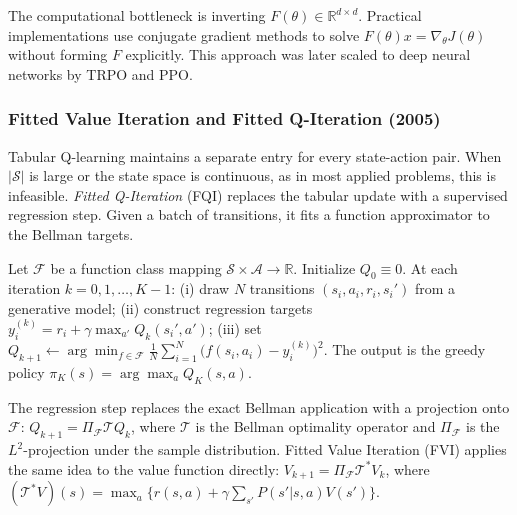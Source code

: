 The computational bottleneck is inverting $F(\theta) \in \mathbb{R}^{d \times d}$. Practical implementations use conjugate gradient methods to solve $F(\theta) x = \nabla_\theta J(\theta)$ without forming $F$ explicitly. This approach was later scaled to deep neural networks by TRPO and PPO.

\subsubsection{Fitted Value Iteration and Fitted Q-Iteration (2005)}
\label{sec:fvi_fqi_algorithms}

Tabular Q-learning maintains a separate entry for every state-action pair. When $|\mathcal{S}|$ is large or the state space is continuous, as in most applied problems, this is infeasible. \emph{Fitted Q-Iteration} (FQI) \citep{Ernst2005} replaces the tabular update with a supervised regression step. Given a batch of transitions, it fits a function approximator to the Bellman targets.

Let $\mathcal{F}$ be a function class mapping $\mathcal{S} \times \mathcal{A} \to \mathbb{R}$.\label{def:fqi} Initialize $Q_0 \equiv 0$. At each iteration $k = 0, 1, \ldots, K-1$: (i) draw $N$ transitions $(s_i, a_i, r_i, s_i')$ from a generative model; (ii) construct regression targets $y_i^{(k)} = r_i + \gamma \max_{a'} Q_k(s_i', a')$; (iii) set $Q_{k+1} \leftarrow \arg\min_{f \in \mathcal{F}} \frac{1}{N} \sum_{i=1}^N \bigl( f(s_i, a_i) - y_i^{(k)} \bigr)^2$. The output is the greedy policy $\pi_K(s) = \arg\max_a Q_K(s,a)$.

The regression step replaces the exact Bellman application with a projection onto $\mathcal{F}$: $Q_{k+1} = \Pi_{\mathcal{F}} \mathcal{T} Q_k$, where $\mathcal{T}$ is the Bellman optimality operator and $\Pi_{\mathcal{F}}$ is the $L^2$-projection under the sample distribution. Fitted Value Iteration (FVI) \citep{MunosSzepesvari2008} applies the same idea to the value function directly: $V_{k+1} = \Pi_{\mathcal{F}} \mathcal{T}^* V_k$, where $(\mathcal{T}^* V)(s) = \max_a \{ r(s,a) + \gamma \sum_{s'} P(s'|s,a) V(s') \}$.

